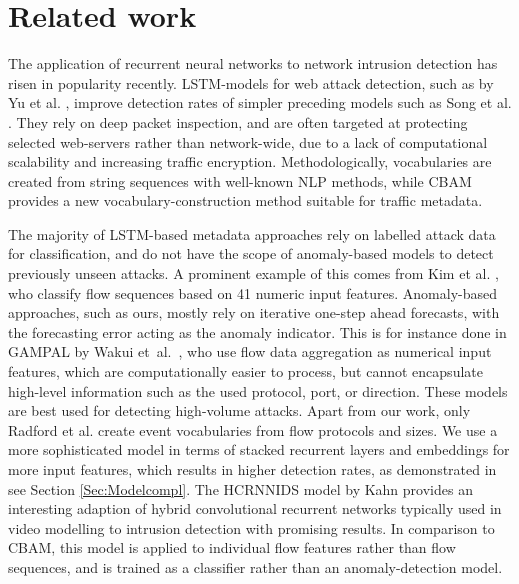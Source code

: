 \section{Related work}\label{Sec:Related work}

The application of recurrent neural networks to network intrusion detection has risen in popularity recently. LSTM-models for web attack detection, such as by Yu et al. \cite{yu2018attention}, improve detection rates of simpler preceding models such as Song et al. \cite{song2009spectrogram}. They rely on deep packet inspection, and are often targeted at protecting selected web-servers rather than network-wide, due to a lack of computational scalability and increasing traffic encryption. Methodologically, vocabularies are created from string sequences with well-known NLP methods, while CBAM provides a new vocabulary-construction method suitable for traffic metadata.

The majority of LSTM-based metadata approaches rely on labelled attack data for classification, and do not have the scope of anomaly-based models to detect previously unseen attacks. %
A prominent example of this comes from Kim et al. \cite{kim2016long}, who classify flow sequences based on 41 numeric input features. %
Anomaly-based approaches, such as ours, mostly rely on iterative one-step ahead forecasts, with the forecasting error acting as the anomaly indicator. This is for instance done in GAMPAL by Wakui et~al.~\cite{wakui2019gampal}, who use flow data aggregation  as numerical input features, which are computationally easier to process, but cannot encapsulate high-level information such as the used protocol, port, or direction. These models are best used for detecting high-volume attacks.
Apart from our work, only Radford et al. \cite{radford2018network} create event vocabularies from flow protocols and sizes. We use a more sophisticated model in terms of stacked recurrent layers and embeddings for more input features, which results in higher detection rates, as demonstrated in see Section \ref{Sec:Modelcompl}. The HCRNNIDS model by Kahn provides an interesting adaption of hybrid convolutional recurrent networks typically used in video modelling to intrusion detection \cite{khan2021hcrnnids} with promising results. In comparison to CBAM, this model is applied to individual flow features rather than flow sequences, and is trained as a classifier rather than an anomaly-detection model.  

